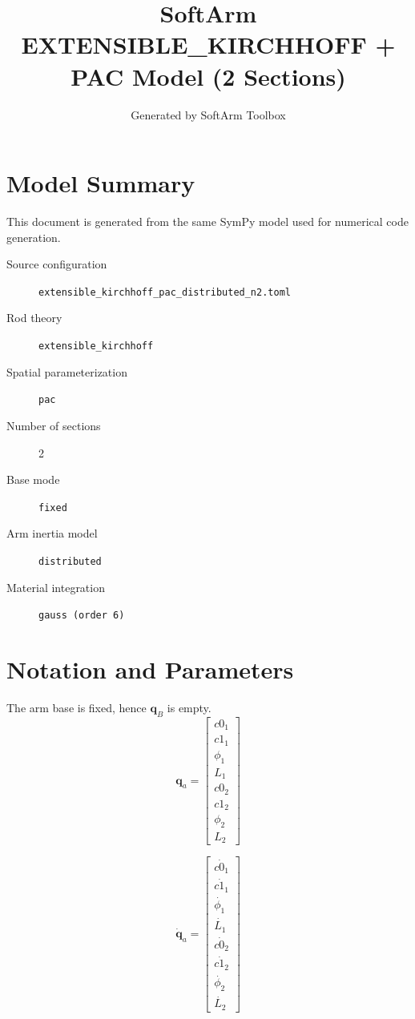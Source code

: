 \documentclass[11pt]{article}
\title{SoftArm EXTENSIBLE\_KIRCHHOFF + PAC Model (2 Sections)}
\author{Generated by SoftArm Toolbox}
\date{}
\begin{document}
\maketitle

\section{Model Summary}
This document is generated from the same SymPy model used for numerical code generation.
\begin{description}
\item[Source configuration] \texttt{extensible\_kirchhoff\_pac\_distributed\_n2.toml}
\item[Rod theory] \texttt{extensible\_kirchhoff}
\item[Spatial parameterization] \texttt{pac}
\item[Number of sections] 2
\item[Base mode] \texttt{fixed}
\item[Arm inertia model] \texttt{distributed}
\item[Material integration] \texttt{gauss (order 6)}
\end{description}

\section{Notation and Parameters}
The arm base is fixed, hence $\boldsymbol q_B$ is empty.
\begin{equation}
\boldsymbol q_a=\begin{bmatrix}c0_{1}\\c1_{1}\\\phi_{1}\\L_{1}\\c0_{2}\\c1_{2}\\\phi_{2}\\L_{2}\end{bmatrix}
\end{equation}

\begin{equation}
\dot{\boldsymbol q}_a=\begin{bmatrix}\dot{c0_{1}}\\\dot{c1_{1}}\\\dot{\phi_{1}}\\\dot{L_{1}}\\\dot{c0_{2}}\\\dot{c1_{2}}\\\dot{\phi_{2}}\\\dot{L_{2}}\end{bmatrix}
\end{equation}
\end{document}
